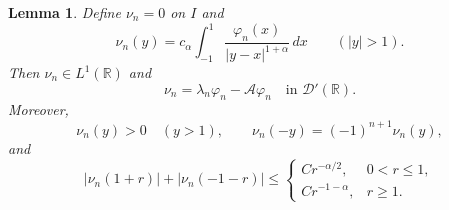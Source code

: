 \documentclass[11pt]{amsart}
\numberwithin{equation}{section}
\newtheorem{lemma}[lemma]{Lemma}
\theoremstyle{remark}
\newcommand{\R}{\mathbb R}
\begin{document}
\begin{lemma}\label{lem:nodal-source}
Define $\nu_n=0$ on $I$ and
\begin{equation}\label{eq:nodal-source-integral}
 \nu_n(y)=c_\alpha\int_{-1}^1
          \frac{\varphi_n(x)}{|y-x|^{1+\alpha}}\,dx
 \qquad(|y|>1).
\end{equation}
Then $\nu_n\in L^1(\R)$ and
\begin{equation}\label{eq:nodal-source-def}
 \nu_n=\lambda_n\varphi_n-\mathcal A\varphi_n
 \quad\text{in }\mathcal D'(\R).
\end{equation}
Moreover,
\begin{equation}\label{eq:nodal-source-sign}
 \nu_n(y)>0\quad(y>1),\qquad \nu_n(-y)=(-1)^{n+1}\nu_n(y),
\end{equation}
and
\begin{equation}\label{eq:nodal-source-est}
 |\nu_n(1+r)|+|\nu_n(-1-r)|\le
 \begin{cases}
 Cr^{-\alpha/2},&0<r\le1,\\
 Cr^{-1-\alpha},&r\ge1.
 \end{cases}
\end{equation}
\end{lemma}
\end{document}
